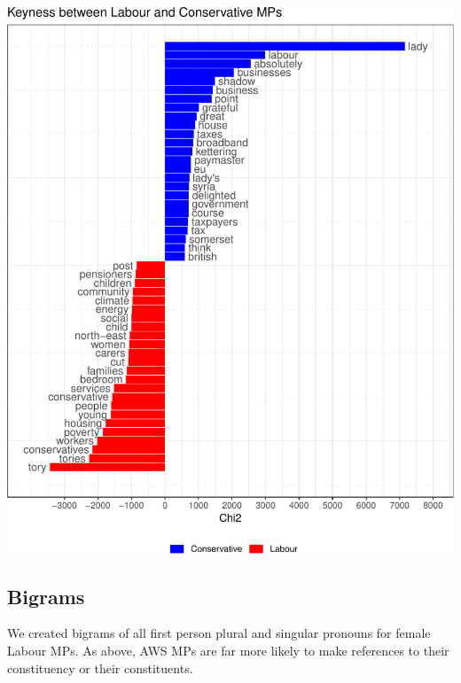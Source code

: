 \documentclass[]{article}
\let\origfigure\figure
\let\endorigfigure\endfigure
\renewenvironment{figure}[1][2] {
    \expandafter\origfigure\expandafter[H]
} {
    \endorigfigure
}
\begin{document}
\begin{figure}
\centering
\includegraphics{methodology_files/figure-latex/lab-con-keyness-1.pdf}
\caption{\label{party-keyness}Keyness between Labour and Conservative
MPs}
\end{figure}

\hypertarget{bigrams}{%
\subsection{Bigrams}\label{bigrams}}

We created bigrams of all first person plural and singular pronouns for
female Labour MPs. As above, AWS MPs are far more likely to make
references to their constituency or their constituents.
\end{document}
